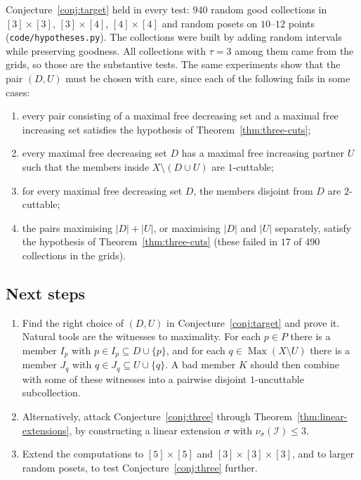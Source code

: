 \documentclass[10pt, a4paper]{article}
\theoremstyle{plain}
\theoremstyle{definition}
\newcommand{\I}{\mathcal{I}}
\begin{document}
Conjecture~\ref{conj:target} held in every test: $940$ random good collections
in $[3]\times[3]$, $[3]\times[4]$, $[4]\times[4]$ and random posets on $10$--$12$
points (\texttt{code/hypotheses.py}). The collections were built by adding random
intervals while preserving goodness. All collections with $\tau=3$ among them came
from the grids, so those are the substantive tests. The same experiments show that
the pair $(D,U)$ must be chosen with care, since each of the following fails in some
cases:
\begin{enumerate}
  \item every pair consisting of a maximal free decreasing set and a maximal free
    increasing set satisfies the hypothesis of Theorem~\ref{thm:three-cuts};
  \item every maximal free decreasing set $D$ has a maximal free increasing partner
    $U$ such that the members inside $X\setminus(D\cup U)$ are $1$-cuttable;
  \item for every maximal free decreasing set $D$, the members disjoint from $D$ are
    $2$-cuttable;
  \item the pairs maximising $|D|+|U|$, or maximising $|D|$ and $|U|$ separately,
    satisfy the hypothesis of Theorem~\ref{thm:three-cuts} (these failed in $17$ of
    $490$ collections in the grids).
\end{enumerate}

\subsection{Next steps}

\begin{enumerate}
  \item Find the right choice of $(D,U)$ in Conjecture~\ref{conj:target} and prove
    it. Natural tools are the witnesses to maximality. For each $p\in P$ there is a
    member $I_p$ with $p\in I_p\subseteq D\cup\{p\}$, and for each
    $q\in\operatorname{Max}(X\setminus U)$ there is a member $J_q$ with
    $q\in J_q\subseteq U\cup\{q\}$. A bad member $K$ should then combine with some of
    these witnesses into a pairwise disjoint $1$-uncuttable subcollection.
  \item Alternatively, attack Conjecture~\ref{conj:three} through
    Theorem~\ref{thm:linear-extensions}, by constructing a linear extension $\sigma$
    with $\nu_\sigma(\I)\le 3$.
  \item Extend the computations to $[5]\times[5]$ and $[3]\times[3]\times[3]$, and
    to larger random posets, to test Conjecture~\ref{conj:three} further.
\end{enumerate}
\end{document}
